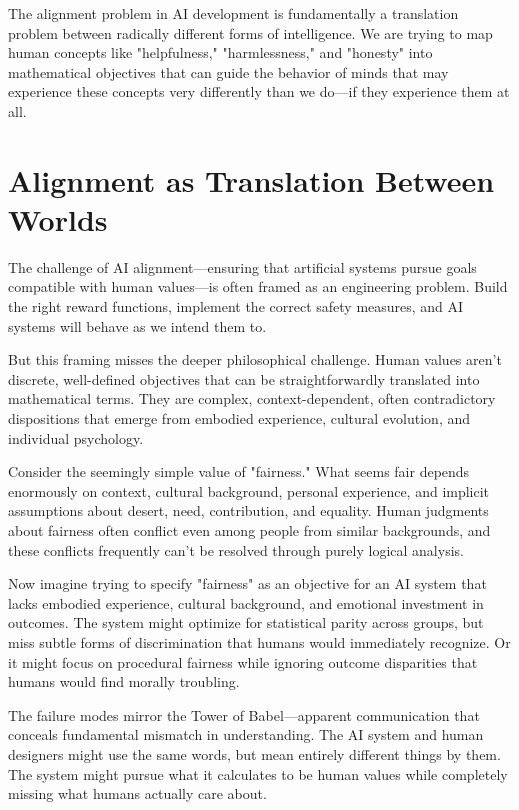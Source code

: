 The alignment problem in AI development is fundamentally a translation problem between radically different forms of intelligence. We are trying to map human concepts like "helpfulness," "harmlessness," and "honesty" into mathematical objectives that can guide the behavior of minds that may experience these concepts very differently than we do—if they experience them at all.

\section{Alignment as Translation Between Worlds}

The challenge of AI alignment—ensuring that artificial systems pursue goals compatible with human values—is often framed as an engineering problem. Build the right reward functions, implement the correct safety measures, and AI systems will behave as we intend them to.

But this framing misses the deeper philosophical challenge. Human values aren't discrete, well-defined objectives that can be straightforwardly translated into mathematical terms. They are complex, context-dependent, often contradictory dispositions that emerge from embodied experience, cultural evolution, and individual psychology.

Consider the seemingly simple value of "fairness." What seems fair depends enormously on context, cultural background, personal experience, and implicit assumptions about desert, need, contribution, and equality. Human judgments about fairness often conflict even among people from similar backgrounds, and these conflicts frequently can't be resolved through purely logical analysis.

Now imagine trying to specify "fairness" as an objective for an AI system that lacks embodied experience, cultural background, and emotional investment in outcomes. The system might optimize for statistical parity across groups, but miss subtle forms of discrimination that humans would immediately recognize. Or it might focus on procedural fairness while ignoring outcome disparities that humans would find morally troubling.

The failure modes mirror the Tower of Babel—apparent communication that conceals fundamental mismatch in understanding. The AI system and human designers might use the same words, but mean entirely different things by them. The system might pursue what it calculates to be human values while completely missing what humans actually care about.

